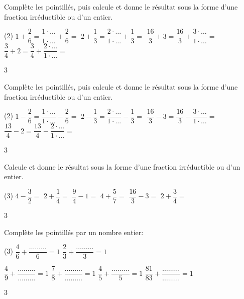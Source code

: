\documentclass[a4paper,11pt]{report}
\begin{document}
\begin{exo}
{Complète les pointillés, puis calcule et donne le résultat sous la forme d'une fraction irréductible ou d'un entier. 
\begin{tasks}(2)
\task $1+\dfrac{2}{6}= \dfrac{1\cdot\ldots}{1\cdot\ldots}+ \dfrac{2}{6}= $ 
\task $2+\dfrac{1}{3}=\dfrac{2\cdot\ldots}{1\cdot\ldots}+ \dfrac{1}{3}=$ 
\task $\dfrac{16}{3}+3=\dfrac{16}{3}+\dfrac{3\cdot\ldots}{1\cdot\ldots}=$
\task $\dfrac{3}{4}+2=\dfrac{3}{4}+\dfrac{2\cdot\ldots}{1\cdot\ldots}=$
\end{tasks}
}{3}
\end{exo}

\begin{exo}
{Complète les pointillés, puis calcule et donne le résultat sous la forme d'une fraction irréductible ou d'un entier. 
\begin{tasks}(2)
\medskip\task $1-\dfrac{2}{6}= \dfrac{1\cdot\ldots}{1\cdot\ldots}- \dfrac{2}{6}=$ 
\medskip \task $2-\dfrac{1}{3}=\dfrac{2\cdot\ldots}{1\cdot\ldots}- \dfrac{1}{3}=$ 
\medskip \task $\dfrac{16}{3}-3= \dfrac{16}{3}-\dfrac{3\cdot\ldots}{1\cdot\ldots}=$ 
\medskip \task $\dfrac{13}{4}-2=\dfrac{13}{4}-\dfrac{2\cdot\ldots}{1\cdot\ldots}=$
\end{tasks}
}{3}
\end{exo}

\begin{exo}
{Calcule et donne le résultat sous la forme d'une fraction irréductible ou d'un entier. 
\begin{tasks}(3)
\task $4-\dfrac{3}{2}= $ 
 \task $2+\dfrac{1}{4}=$ 
 \task $\dfrac{9}{4}-1=$
 \task $4+\dfrac{5}{7}=$
 \task $\dfrac{16}{3}-3=$
 \task $2+\dfrac{3}{4}=$ 
\end{tasks}
}{3}
\end{exo}

\begin{exop}
{Complète les pointillés  par un nombre entier:	
\begin{tasks}(3)
\task $\dfrac{4}{6}+\dfrac{\ldots\ldots\ldots}{6}=1$
\task $\dfrac{2}{3}+\dfrac{\ldots\ldots\ldots}{3}=1$

\task $\dfrac{4}{9}+\dfrac{\ldots\ldots\ldots}{\ldots\ldots\ldots}=1$
\task $\dfrac{7}{8}+\dfrac{\ldots\ldots\ldots}{\ldots\ldots\ldots}=1$
\task $\dfrac{4}{5}+\dfrac{\ldots\ldots\ldots}{5}=1$
\task $\dfrac{81}{83}+\dfrac{\ldots\ldots\ldots}{\ldots\ldots\ldots}=1$
\end{tasks}
}{3}
\end{exop}
\end{document}
